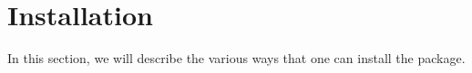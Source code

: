 \section{Installation}
\label{sec:installation}

In this section, we will describe the various ways that one can install the 
\thispackage package.


